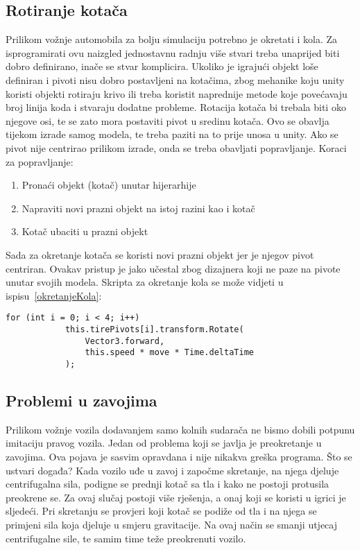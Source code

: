 \subsection{Rotiranje kotača}
Prilikom vožnje automobila za bolju simulaciju potrebno je okretati i kola. Za isprogramirati ovu naizgled jednostavnu radnju više stvari treba unaprijed biti dobro definirano, inače se stvar komplicira. Ukoliko je igrajući objekt loše definiran i pivoti nisu dobro postavljeni na kotačima, zbog mehanike koju unity koristi objekti rotiraju krivo ili treba koristit naprednije metode koje povećavaju broj linija koda i stvaraju dodatne probleme. Rotacija kotača bi trebala biti oko njegove osi, te se zato mora postaviti pivot u sredinu kotača. Ovo se obavlja tijekom izrade samog modela, te treba paziti na to prije unosa u unity. Ako se pivot nije centrirao prilikom izrade, onda se treba obavljati popravljanje. Koraci za popravljanje:
\begin{enumerate}
	\item Pronaći objekt (kotač) unutar hijerarhije
	\item Napraviti novi prazni objekt na istoj razini kao i kotač
	\item Kotač ubaciti u prazni objekt
\end{enumerate}
Sada za okretanje kotača se koristi novi prazni objekt jer je njegov pivot centriran. Ovakav pristup je jako učestal zbog dizajnera koji ne paze na pivote unutar svojih modela. Skripta za okretanje kola se može vidjeti u ispisu~\ref{okretanjeKola}:
\vspace{6mm}
\begin{lstlisting}[caption={Skripta za okretanje kola}, label=okretanjeKola]
for (int i = 0; i < 4; i++) 
			this.tirePivots[i].transform.Rotate(
			    Vector3.forward, 
			    this.speed * move * Time.deltaTime
			);	
\end{lstlisting}
\subsection{Problemi u zavojima}
Prilikom vožnje vozila dodavanjem samo kolnih sudarača ne bismo dobili potpunu imitaciju pravog vozila. Jedan od problema koji se javlja je preokretanje u zavojima. Ova pojava je sasvim opravdana i nije nikakva greška programa. Što se ustvari događa? Kada vozilo uđe u zavoj i započme skretanje, na njega djeluje centrifugalna sila, podigne se prednji kotač sa tla i kako ne postoji protusila preokrene se. 
\vspace{2mm}
\newline Za ovaj slučaj postoji više rješenja, a onaj koji se koristi u igrici je sljedeći. Pri skretanju se provjeri koji kotač se podiže od tla i na njega se primjeni sila koja djeluje u smjeru gravitacije. Na ovaj način se smanji utjecaj centrifugalne sile, te samim time teže preokrenuti vozilo.
